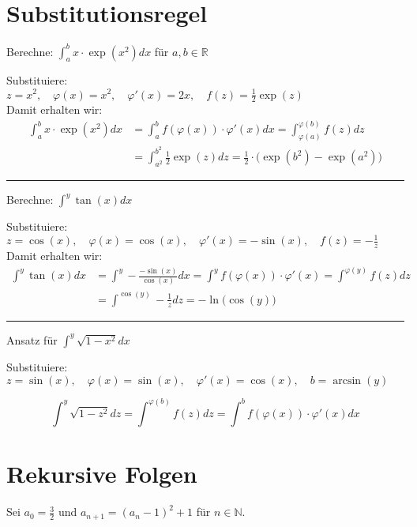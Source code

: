 \documentclass[10pt,a4paper]{article}
\begin{document}
\begin{multicols*}{2}
\section*{Substitutionsregel}
Berechne: $\displaystyle \int_a^b x\cdot\exp(x^2)dx$ für $a,b\in\mathbb{R}$

Substituiere:\\
$ \displaystyle
z = x^2, \quad
\varphi(x) = x^2, \quad
\varphi'(x) = 2x, \quad
f(z) = \frac{1}{2}\exp(z)$ \\

Damit erhalten wir:
\begin{align*}
	\int_a^b x\cdot\exp(x^2)dx &= \int_a^b f(\varphi(x))\cdot\varphi'(x)dx = \int_{\varphi(a)}^{\varphi(b)}f(z)dz \\
							   &= \int_{a^2}^{b^2}\frac{1}{2}\exp(z)dz = \frac{1}{2}\cdot\big(\exp(b^2)-\exp(a^2)\big)
\end{align*}

\hrule
\vspace{1em}

Berechne: $\displaystyle \int^y\tan(x)dx$

Substituiere: \\
$ \displaystyle
z = \cos(x), \quad
\varphi(x) = \cos(x), \quad
\varphi'(x) = -\sin(x), \quad
f(z) = -\frac{1}{z}$ \\

Damit erhalten wir:
\begin{align*}
	\int^y\tan(x)dx &= \int^y-\frac{-\sin(x)}{\cos(x)}dx = \int^y f(\varphi(x))\cdot\varphi'(x) = \int^{\varphi(y)}f(z)dz \\
					&= \int^{\cos(y)}-\frac{1}{z}dz = -\ln\big(\cos(y)\big)
\end{align*}

\hrule
\vspace{1em}

Ansatz für $\displaystyle \int^y\sqrt{1-x^2}dx$

Substituiere:\\
$ \displaystyle
z = \sin(x), \quad
\varphi(x) = \sin(x), \quad
\varphi'(x) = \cos(x), \quad
b=\arcsin(y)$

\[\int^y\sqrt{1-z^2}dz=\int^{\varphi(b)}f(z)dz=\int^b f(\varphi(x))\cdot\varphi'(x)dx\]

\section*{Rekursive Folgen}
Sei $a_0 = \frac{3}{2}$ und $a_{n+1} = (a_n - 1)^2 + 1$ für $n\in\mathbb{N}$.


\end{multicols*}
\end{document}
